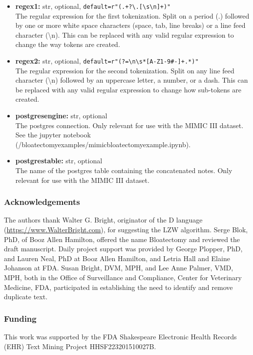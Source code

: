\documentclass[runningheads,a4paper]{llncs}
\begin{document}
\begin{itemize}
\item
\textbf{regex1:} str, optional, \verb|default=r"(.+?\.[\s\n]+)"|\\
The regular expression for the first tokenization. Split on a period ($.$) followed by one or more white space characters (space, tab, line breaks) or a line feed character (\textbackslash{}n). This can be replaced with any valid regular expression to change the way tokens are created.
\medskip

\item
\textbf{regex2:} str, optional, \verb|default=r"(?=\n\s*[A-Z1-9#-]+.*)"|  \\
The regular expression for the second tokenization. Split on any line feed character (\textbackslash{}n) followed by an uppercase letter, a number, or a dash. This can be replaced with any valid regular expression to change how sub-tokens are created.
\medskip

\item
\textbf{postgres\textunderscore engine:} str, optional\\
The postgres connection. Only relevant for use with the MIMIC III dataset. See the jupyter notebook \\(/bloatectomy\textunderscore examples/mimic\textunderscore  bloatectomy\textunderscore example.ipynb).
\medskip

\item
\textbf{postgres\textunderscore table:} str, optional\\
The name of the postgres table containing the concatenated notes. Only relevant for use with the MIMIC III dataset.
\end{itemize}


\subsubsection{Acknowledgements}
The authors thank Walter G. Bright, originator of the D language (\url{https://www.WalterBright.com}), for suggesting the LZW algorithm. Serge Blok, PhD, of Booz Allen Hamilton, offered the name Bloatectomy and reviewed the draft manuscript. Daily project support was provided by George Plopper, PhD, and Lauren Neal, PhD at Booz Allen Hamilton, and Letria Hall and Elaine Johanson at FDA. Susan Bright, DVM, MPH, and Lee Anne Palmer, VMD, MPH, both in the Office of Surveillance and Compliance, Center for Veterinary Medicine, FDA, participated in establishing the need to identify and remove duplicate text.

\subsubsection{Funding}
This work was supported by the FDA Shakespeare Electronic Health Records (EHR) Text Mining Project HHSF223201510027B.
\end{document}
